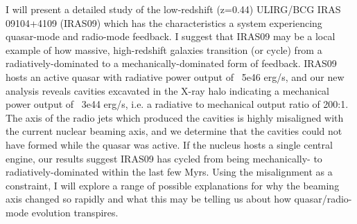I will present a detailed study of the low-redshift (z=0.44) ULIRG/BCG IRAS 09104+4109 (IRAS09) which has the characteristics a system experiencing quasar-mode and radio-mode feedback. I suggest that IRAS09 may be a local example of how massive, high-redshift galaxies transition (or cycle) from a radiatively-dominated to a mechanically-dominated form of feedback. IRAS09 hosts an active quasar with radiative power output of ~5e46 erg/s, and our new analysis reveals cavities excavated in the X-ray halo indicating a mechanical power output of ~3e44 erg/s, i.e. a radiative to mechanical output ratio of 200:1. The axis of the radio jets which produced the cavities is highly misaligned with the current nuclear beaming axis, and we determine that the cavities could not have formed while the quasar was active. If the nucleus hosts a single central engine, our results suggest IRAS09 has cycled from being mechanically- to radiatively-dominated within the last few Myrs. Using the misalignment as a constraint, I will explore a range of possible explanations for why the beaming axis changed so rapidly and what this may be telling us about how quasar/radio-mode evolution transpires.
